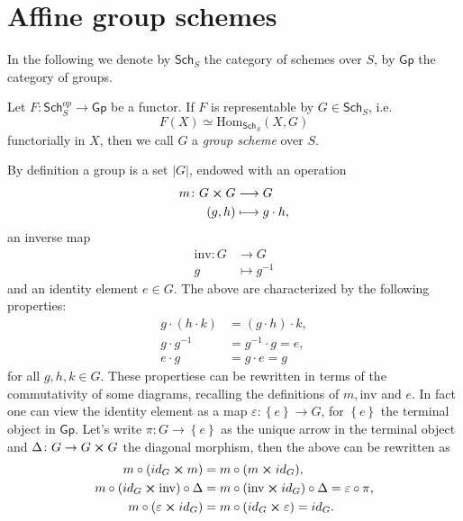 \documentclass[../Main]{subfiles}
\begin{document}
\chapter{Affine group schemes}
In the following we denote by $\mathsf{Sch}_{S}$ the category of schemes over $S$,
by $\mathsf{Gp}$ the category of groups.
\begin{defn}
	Let $F\colon \mathsf{Sch}_S^{op} \to \mathsf{Gp}$ be a functor.
	If $F$ is representable by $G \in \mathsf{Sch}_{ S }$, i.e.
	\begin{equation}
		F(X) \simeq \mathrm{Hom}_{\mathsf{Sch}_S} \left( X, G \right)
	\end{equation} 
	functorially in $X$, then we call $G$ a {\em group scheme} over $S$.
\end{defn}

\begin{rem}[]
	By definition a group is a set $|G|$, endowed with an operation
	\begin{align}
		m\colon G \cross G &\longrightarrow G \\
		(g,h) &\longmapsto g \cdot h \nonumber
	,\end{align} 
	an inverse map 
	\begin{align}
		\mathrm{inv}\colon G &\longrightarrow G \\
		g &\longmapsto g^{-1} \nonumber
	\end{align}
	and an identity element $e \in G$.
	The above are characterized by the following properties:
	\begin{align}
		g \cdot (h \cdot k) &= (g \cdot h) \cdot k,\\
		g \cdot g^{-1} &= g^{-1} \cdot g = e,\\
		e \cdot g &= g \cdot e = g
	\end{align} 
	for all $g,h,k \in G$.
	These propertiese can be rewritten in terms of the commutativity of some diagrams,
	recalling the definitions of $m, \mathrm{inv}$ and $e$.
	In fact one can view the identity element as a map
	$\varepsilon\colon \left\{ e \right\} \to G$, 
	for $\left\{ e \right\}$ the terminal object in $\mathsf{Gp}$.
	Let's write $\pi\colon G \to \left\{ e \right\}$
	as the unique arrow in the terminal object
	and $\Delta\colon G \to G \cross G$ the diagonal morphism,
	then the above can be rewritten as
	\begin{align}
		m \circ (id_G \cross m) &= m \circ (m \cross id_G),\\
		m \circ (id_G \cross \mathrm{inv}) \circ \Delta &=
		m \circ (\mathrm{inv} \cross id_G) \circ \Delta = \varepsilon \circ \pi,\\
		m \circ (\varepsilon \cross id_G) &=
		m \circ (id_G \cross \varepsilon) = id_G
	.\end{align} 
\end{rem}
\end{document}
